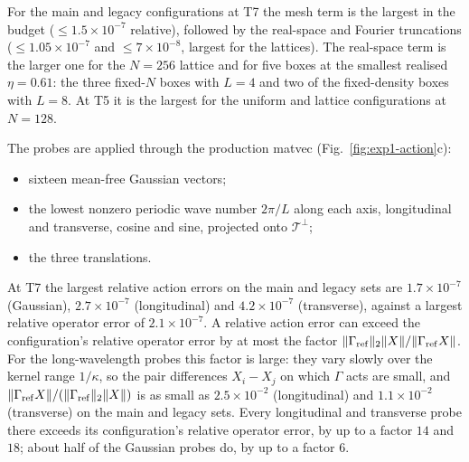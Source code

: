For the main and legacy configurations at T7 the mesh term is the largest in the budget ($\le1.5\times10^{-7}$
relative), followed by the real-space and Fourier truncations ($\le1.05\times10^{-7}$ and $\le7\times10^{-8}$, largest for
the lattices). The real-space term is the larger one for the $N=256$ lattice and for five boxes at the smallest
realised $\eta=0.61$: the three fixed-$N$ boxes with $L=4$ and two of the fixed-density boxes with $L=8$. At T5 it is
the largest for the uniform and lattice configurations at $N=128$.

The probes are applied through the production matvec (Fig.~\ref{fig:exp1-action}c):
\begin{itemize}
\item sixteen mean-free Gaussian vectors;
\item the lowest nonzero periodic wave number $2\pi/L$ along each axis, longitudinal and transverse, cosine and sine,
  projected onto $\mathcal T^\perp$;
\item the three translations.
\end{itemize}
At T7 the largest relative action errors on the main and legacy sets are $1.7\times10^{-7}$ (Gaussian),
$2.7\times10^{-7}$ (longitudinal) and $4.2\times10^{-7}$ (transverse), against a largest relative operator error of
$2.1\times10^{-7}$. A relative action error can exceed the configuration's relative operator error by at most the factor
$\|\Gamma_{\rm ref}\|_2\|X\|/\|\Gamma_{\rm ref}X\|$. For the long-wavelength probes this factor is large: they vary slowly
over the kernel range $1/\kappa$, so the pair differences $X_i-X_j$ on which $\Gamma$ acts are small, and
$\|\Gamma_{\rm ref}X\|/(\|\Gamma_{\rm ref}\|_2\|X\|)$ is as small as
$2.5\times10^{-2}$ (longitudinal) and $1.1\times10^{-2}$ (transverse) on the main and legacy sets. Every longitudinal
and transverse probe there exceeds its configuration's relative operator error, by up to a factor $14$ and $18$; about
half of the Gaussian probes do, by up to a factor $6$.


